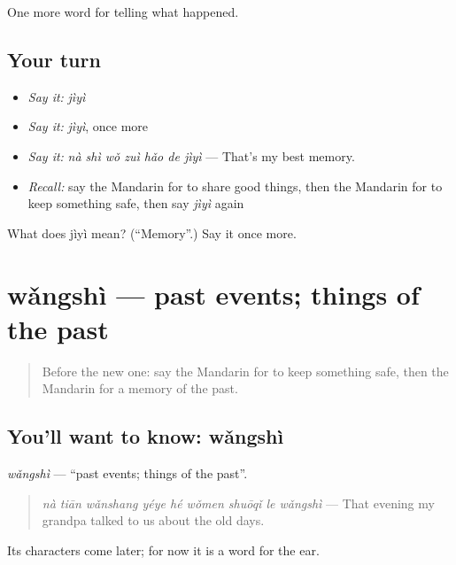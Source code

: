 \begin{grammarlens}[title={What you've built}]
One more word for telling what happened.
\end{grammarlens}

\subsection*{Your turn}
\begin{itemize}
\raggedright
  \item \emph{Say it:} \emph{jìyì}
  \item \emph{Say it:} \emph{jìyì}, once more
  \item \emph{Say it:} \emph{nà shì wǒ zuì hǎo de jìyì} — That's my best memory.
  \item \emph{Recall:} say the Mandarin for to share good things, then the Mandarin for to keep something safe, then say \emph{jìyì} again
\end{itemize}

\begin{tcolorbox}[breakable,colback=teal!4,colframe=teal!35!black,title={Before you move on}]
What does jìyì mean? (\textquotedblleft{}Memory\textquotedblright{}.) Say it once more.
\end{tcolorbox}
\section[wǎngshì]{wǎngshì — past events; things of the past}

\label{lesson:ZH-C344-wangshi}



\begin{quote}
Before the new one: say the Mandarin for to keep something safe, then the Mandarin for a memory of the past.
\end{quote}

\subsection*{You'll want to know: wǎngshì}
\emph{wǎngshì} — \textquotedblleft{}past events; things of the past\textquotedblright{}.

\begin{quote}
\emph{nà tiān wǎnshang yéye hé wǒmen shuōqǐ le wǎngshì} — That evening my grandpa talked to us about the old days.
\end{quote}

Its characters come later; for now it is a word for the ear.

